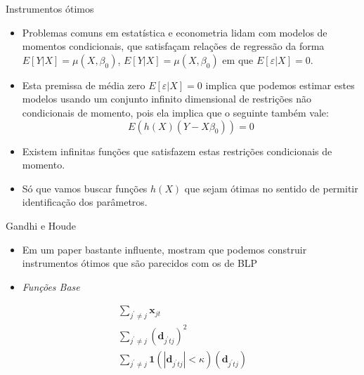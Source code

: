\documentclass{beamer}
\begin{document}
\begin{frame}{Instrumentos ótimos}
\begin{itemize}
    \item Problemas comuns em estatística e econometria lidam com modelos de momentos condicionais, que satisfaçam relações de regressão da forma $E[Y|X]=\mu (X,\beta_{0})$, $E[Y|X]=\mu (X,\beta_{0})$ em que  $E[\varepsilon |X]=0$.
    \item Esta premissa de média zero $E[\varepsilon |X]=0$ implica que podemos estimar estes modelos usando um conjunto infinito dimensional de restrições não condicionais de momento, pois ela implica que o seguinte também vale:
    \[
    E(h(X)(Y-X\beta_{0}))=0
    \]
    \item Existem infinitas funções que satisfazem estas restrições condicionais de momento.
    \item Só que vamos buscar funções $h(X)$ que sejam ótimas no sentido de permitir identificação dos parâmetros.

\end{itemize}
    
\end{frame}

\begin{frame}{Gandhi e Houde}
\begin{itemize}
    \item Em um paper bastante influente, \citet{Gandhi2015} mostram que podemos construir instrumentos ótimos que são parecidos com os de BLP
    \item \textit{Funções Base}
\end{itemize}
\begin{align}
    \sum_{j^{\prime} \neq j} \mathbf{x}_{jt}\\
    \sum_{j^{\prime} \neq j} (\mathbf{d}_{j^{\prime} t j})^{2}\\
    \sum_{j^{\prime} \neq j} \mathbf{1}(|\mathbf{d}_{j^{\prime} t j}|<\kappa)(\mathbf{d}_{j^{\prime} t j})
\end{align}
    
\end{frame}
\end{document}
